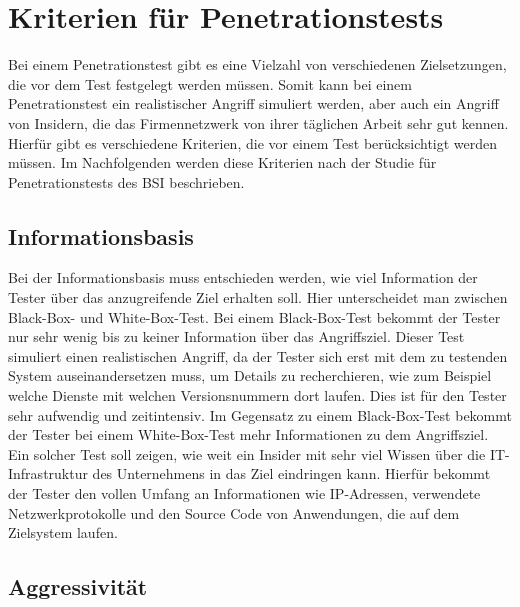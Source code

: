 \section{Kriterien für Penetrationstests}

Bei einem Penetrationstest gibt es eine Vielzahl von verschiedenen Zielsetzungen, die vor dem Test festgelegt
werden müssen. Somit kann bei einem Penetrationstest ein realistischer Angriff simuliert werden, aber auch
ein Angriff von Insidern, die das Firmennetzwerk von ihrer täglichen Arbeit sehr gut kennen. Hierfür gibt es
verschiedene Kriterien, die vor einem Test berücksichtigt werden müssen. Im Nachfolgenden werden diese
Kriterien nach der Studie für Penetrationstests des BSI\cite{pt03bsi} beschrieben.

\subsection{Informationsbasis}

Bei der Informationsbasis muss entschieden werden, wie viel Information der Tester über das anzugreifende
Ziel erhalten soll. Hier unterscheidet man zwischen Black-Box- und White-Box-Test. Bei einem Black-Box-Test bekommt der Tester nur sehr wenig bis zu keiner Information über das Angriffsziel. Dieser Test simuliert einen realistischen Angriff, da der Tester sich erst mit dem zu testenden System auseinandersetzen muss, um Details zu recherchieren, wie zum Beispiel welche Dienste mit welchen Versionsnummern
dort laufen. Dies ist für den Tester sehr aufwendig und zeitintensiv. Im Gegensatz zu einem Black-Box-Test bekommt der Tester bei einem White-Box-Test mehr Informationen
zu dem Angriffsziel. Ein solcher Test soll zeigen, wie weit ein Insider mit sehr viel Wissen über die IT-Infrastruktur
des Unternehmens in das Ziel eindringen kann. Hierfür bekommt der Tester den vollen Umfang
an Informationen wie IP-Adressen, verwendete Netzwerkprotokolle und den Source Code von Anwendungen,
die auf dem Zielsystem laufen\cite[13-14]{pt03bsi}.

\subsection{Aggressivität}

